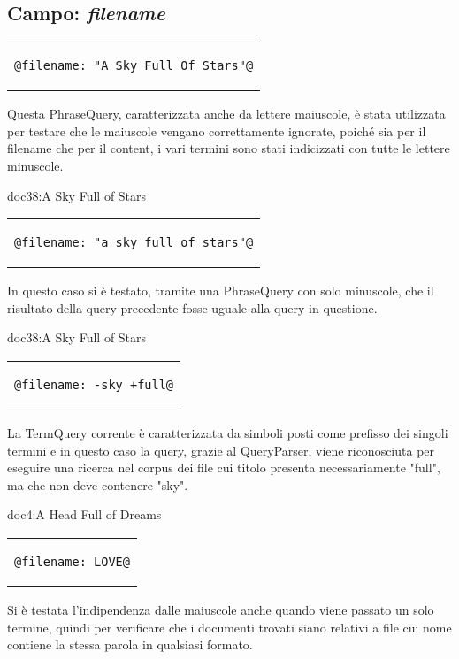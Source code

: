 \documentclass{article}
\begin{document}
\subsection{Campo: \textit{filename}} \label{filenameFieldQuery}

\begin{center}
\begin{tabular}{c}
\begin{lstlisting}[style=prompt]
    @filename: "A Sky Full Of Stars"@
\end{lstlisting}
\end{tabular}    
\end{center}
Questa PhraseQuery, caratterizzata anche da lettere maiuscole, è stata utilizzata per testare che le maiuscole vengano correttamente ignorate, poiché sia per il filename che per il content, i vari termini sono stati indicizzati con tutte le lettere minuscole.

doc38:A Sky Full of Stars

\begin{center}
\begin{tabular}{c}
\begin{lstlisting}[style=prompt]
    @filename: "a sky full of stars"@
\end{lstlisting}
\end{tabular}    
\end{center}
In questo caso si è testato, tramite una PhraseQuery con solo minuscole, che il risultato della query precedente fosse uguale alla query in questione.

doc38:A Sky Full of Stars

\begin{center}
\begin{tabular}{c}
\begin{lstlisting}[style=prompt]
    @filename: -sky +full@
\end{lstlisting}
\end{tabular}    
\end{center}
La TermQuery corrente è caratterizzata da simboli posti come prefisso dei singoli termini e in questo caso la query, grazie al QueryParser, viene riconosciuta per eseguire una ricerca nel corpus dei file cui titolo presenta necessariamente "full", ma che non deve contenere "sky".

doc4:A Head Full of Dreams

\begin{center}
\begin{tabular}{c}
\begin{lstlisting}[style=prompt]
    @filename: LOVE@
\end{lstlisting}
\end{tabular}    
\end{center}
Si è testata l'indipendenza dalle maiuscole anche quando viene passato un solo termine, quindi per verificare che i documenti trovati siano relativi a file cui nome contiene la stessa parola in qualsiasi formato.
\end{document}
